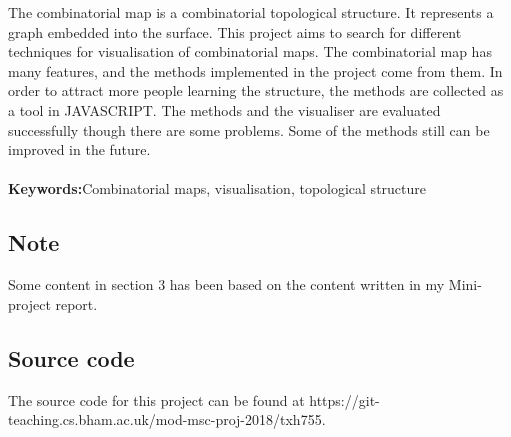 







\setlength\parindent{0pt} 

%

The combinatorial map is a combinatorial topological structure. It represents a graph embedded into the surface. This project aims to search for different techniques for visualisation of combinatorial maps. The combinatorial map has many features, and the methods implemented in the project come from them. In order to attract more people learning the structure, the methods are collected as a tool in JAVASCRIPT. The methods and the visualiser are evaluated successfully though there are some problems. Some of the methods still can be improved in the future.
\\
\\
\textbf{Keywords:}Combinatorial maps, visualisation, topological structure

\par{}%
\null\vfill

\parbox{\textwidth}{
\subsection*{Note}
Some content in section 3 has been based on the content written in my Mini-project report\cite{tingyu2019drawer}. 

\subsection*{Source code} 

The source code for this project can be found at https://git-teaching.cs.bham.ac.uk/mod-msc-proj-2018/txh755.
}